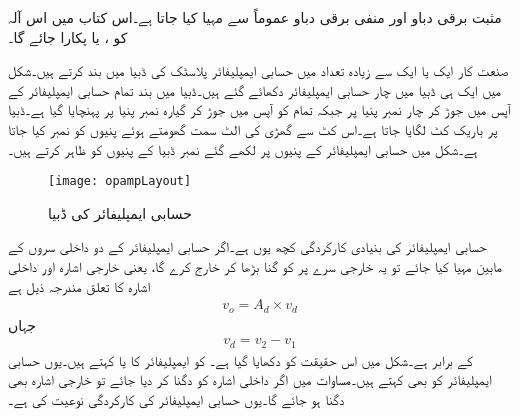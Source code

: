 مثبت برقی دباو اور منفی برقی دباو عموماً  سے مہیا کیا جاتا ہے۔اس کتاب میں اس آلہ کو ،   یا   پکارا جائے گا۔

صنعت کار ایک یا ایک سے زیادہ تعداد میں حسابی ایمپلیفائر پلاسٹک کی ڈبیا میں بند کرتے ہیں۔شکل  میں ایک ہی ڈبیا میں چار حسابی ایمپلیفائر دکھائے گئے ہیں۔ڈبیا میں بند تمام حسابی ایمپلیفائر کے  آپس میں جوڑ کر چار نمبر پنیا پر جبکہ  تمام   کو آپس میں جوڑ کر گیارہ نمبر پنیا پر پہنچایا گیا ہے۔ڈبیا پر باریک کٹ لگایا جاتا ہے۔اس کٹ سے گھڑی کی الٹ سمت گھومتے ہوئے پنیوں کو نمبر کیا جاتا ہے۔شکل  میں حسابی ایمپلیفائر کے پنیوں پر  لکھے گئے نمبر ڈبیا کے پنیوں کو ظاہر کرتے ہیں۔ 
\begin{figure}
\centering
\texttt{[image: opampLayout]}
\caption{حسابی ایمپلیفائر کی ڈبیا}
\label{شکل_حسابی_ایمپلیفائر_کی_ڈبیا}
\end{figure}

حسابی ایمپلیفائر کی بنیادی کارکردگی کچھ یوں ہے۔اگر حسابی ایمپلیفائر کے دو داخلی سروں کے مابین   مہیا کیا جائے تو یہ خارجی سرے پر کو  گنا بڑھا کر خارج کرے گا، یعنی خارجی اشارہ اور داخلی اشارہ کا تعلق مندرجہ ذیل ہے
\begin{align} 
\label{مساوات_حسابی_بنیادی_کارکردگی}
v_o=A_d \times v_d
\end{align}
جہاں
\begin{align}
v_d=v_2-v_1
\end{align}
کے برابر ہے۔شکل   میں اس حقیقت کو دکھایا گیا ہے۔ کو ایمپلیفائر کا  یا  کہتے ہیں۔یوں حسابی ایمپلیفائر کو  بھی کہتے ہیں۔مساوات   میں اگر داخلی اشارہ کو دگنا کر دیا جائے تو خارجی اشارہ بھی دگنا ہو جائے گا۔یوں حسابی ایمپلیفائر کی کارکردگی  نوعیت کی ہے۔
	
